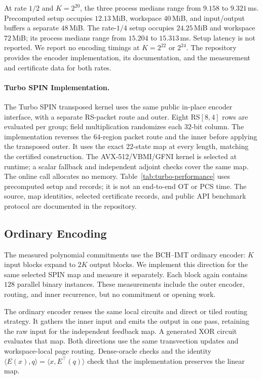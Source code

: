At rate $1/2$ and $K=2^{20}$, the three process medians range from
$9.158$ to $9.321$\,ms. Precomputed setup occupies $12.13$\,MiB,
workspace $40$\,MiB, and input/output buffers a separate $48$\,MiB.
The rate-$1/4$ setup occupies $24.25$\,MiB and workspace $72$\,MiB;
its process medians range from $15.204$ to $15.313$\,ms.
Setup latency is not reported. We report no encoding timings at
$K=2^{22}$ or $2^{24}$.
The repository provides the encoder implementation, its documentation,
and the measurement and certificate data for both rates\repositorycite.

\paragraph{Turbo SPIN Implementation.}
The Turbo SPIN transposed kernel uses the same public in-place encoder
interface, with a separate RS-packet route and outer. Eight RS$[8,4]$
rows are evaluated per group; field multiplication randomizes each
$32$-bit column. The implementation reverses the $64$-region packet route
and the inner before applying the transposed outer. It uses the exact
$22$-state map at every length, matching the certified construction.
The AVX-512/VBMI/GFNI kernel is selected at runtime;
a scalar fallback and independent adjoint checks cover the same map.
The online call allocates no memory. Table~\ref{tab:turbo-performance}
uses precomputed setup and records; it is not an end-to-end OT or PCS time.
The source, map identities, selected certificate records, and public API
benchmark protocol are documented in the repository\repositorycite.

\subsection{Ordinary Encoding}
\label{sec:ordinary-encoding}

The measured polynomial commitments use the BCH--IMT ordinary encoder:
$K$ input blocks
expand to $2K$ output blocks. We implement this direction for the same
selected SPIN map and measure it separately. Each block again contains
$128$ parallel binary instances. These measurements include the outer
encoder, routing, and inner recurrence, but no commitment or opening work.

The ordinary encoder reuses the same local circuits and direct or tiled routing
strategy. It gathers the inner input and emits the output in one pass,
retaining the raw input for the independent feedback map. A generated XOR
circuit evaluates that map. Both directions use the same transvection
updates and workspace-local page routing. Dense-oracle checks and the identity
$\langle E(x),q\rangle=\langle x,E^\top(q)\rangle$ check that the
implementation preserves the linear map.

